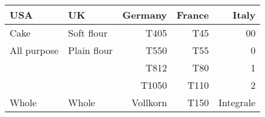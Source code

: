 \begin{tabular}{@{}llrrr@{}}
\toprule
\textbf{USA}  & \textbf{UK}  & {\textbf{Germany}} & {\textbf{France}} & {\textbf{Italy}} \\ \midrule
Cake         & Soft flour  &  T405    &  T45   & 00 \\ 
All purpose  & Plain flour &  T550    &  T55   &  0 \\ 
             &             &  T812    &  T80   &  1 \\ 
             &             & T1050    & T110   &  2 \\ 
Whole        & Whole       & Vollkorn & T150   & Integrale \\ \bottomrule
\end{tabular}
